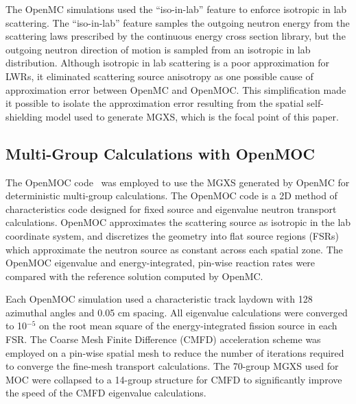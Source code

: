 The OpenMC simulations used the ``iso-in-lab'' feature to enforce isotropic in lab scattering. The ``iso-in-lab'' feature samples the outgoing neutron energy from the scattering laws prescribed by the continuous energy cross section library, but the outgoing neutron direction of motion is sampled from an isotropic in lab distribution. Although isotropic in lab scattering is a poor approximation for LWRs, it eliminated scattering source anisotropy as one possible cause of approximation error between OpenMC and OpenMOC. This simplification made it possible to isolate the approximation error resulting from the spatial self-shielding model used to generate MGXS, which is the focal point of this paper.

\subsection{Multi-Group Calculations with OpenMOC}
\label{subsec:openmoc}

The OpenMOC code~\citep{boyd2014openmoc} was employed to use the MGXS generated by OpenMC for deterministic multi-group calculations. The OpenMOC code is a 2D method of characteristics code designed for fixed source and eigenvalue neutron transport calculations. OpenMOC approximates the scattering source as isotropic in the lab coordinate system, and discretizes the geometry into flat source regions (FSRs) which approximate the neutron source as constant across each spatial zone. The OpenMOC eigenvalue and energy-integrated, pin-wise reaction rates were compared with the reference solution computed by OpenMC.

Each OpenMOC simulation used a characteristic track laydown with 128 azimuthal angles and 0.05 cm spacing. All eigenvalue calculations were converged to 10$^{-5}$ on the root mean square of the energy-integrated fission source in each FSR. The Coarse Mesh Finite Difference (CMFD) acceleration scheme was employed on a pin-wise spatial mesh to reduce the number of iterations required to converge the fine-mesh transport calculations. The 70-group MGXS used for MOC were collapsed to a 14-group structure for CMFD to significantly improve the speed of the CMFD eigenvalue calculations.